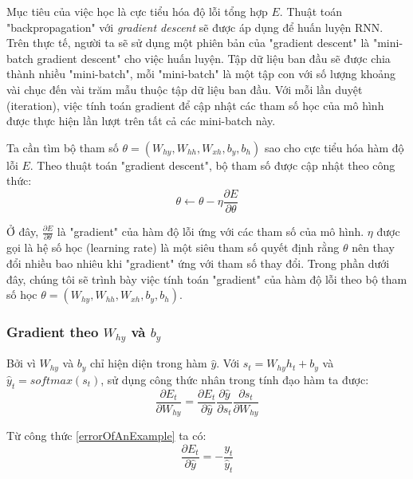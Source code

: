 Mục tiêu của việc học là cực tiểu hóa độ lỗi tổng hợp $E$. Thuật toán "backpropagation" với \textit{gradient descent} sẽ được áp dụng để huấn luyện RNN. Trên thực tế, người ta sẽ sử dụng một phiên bản của "gradient descent" là "mini-batch gradient descent" cho việc huấn luyện. Tập dữ liệu ban đầu sẽ được chia thành nhiều "mini-batch", mỗi "mini-batch" là một tập con với số lượng khoảng vài chục đến vài trăm mẫu thuộc tập dữ liệu ban đầu. Với mỗi lần duyệt (iteration), việc tính toán gradient để cập nhật các tham số học của mô hình được thực hiện lần lượt trên tất cả các mini-batch này.

Ta cần tìm bộ tham số $\theta = \left(W_{hy},W_{hh},W_{xh},b_y,b_h \right)$ sao cho cực tiểu hóa hàm độ lỗi $E$. Theo thuật toán "gradient descent", bộ tham số được cập nhật theo công thức:
\begin{equation} \label{gradientDescentWithTheta}
	\theta \leftarrow \theta - \eta \frac{\partial{E} }{\partial{\theta}}
\end{equation}

Ở đây, $\frac{\partial{E} }{\partial{\theta}}$ là "gradient" của hàm độ lỗi ứng với các tham số của mô hình. $\eta$ được gọi là hệ số học (learning rate) là một siêu tham số quyết định rằng $\theta$ nên thay đổi nhiều bao nhiêu khi "gradient" ứng với tham số thay đổi. Trong phần dưới đây, chúng tôi sẽ trình bày việc tính toán "gradient" của hàm độ lỗi theo bộ tham số học $\theta = \left(W_{hy},W_{hh},W_{xh},b_y,b_h \right)$.

\subsubsection{Gradient theo $W_{hy}$ và $b_y$}
Bởi vì $W_{hy}$ và $b_y$ chỉ hiện diện trong hàm $\hat{y}$. Với $s_t = W_{hy} h_t + b_y$ và $\hat{y}_t = softmax(s_t)$, sử dụng công thức nhân trong tính đạo hàm ta được:
\begin{equation} \label{gradientWRTSt1}
	\frac{\partial{E_t}}{\partial{W_{hy}}} = \frac{\partial{E_t}}{\partial{\hat{y}}} \frac{\partial{\hat{y}}}{\partial{s_t}} \frac{\partial{s_t}}{\partial{W_{hy}}}
\end{equation}

Từ công thức \ref{errorOfAnExample} ta có:
\begin{equation} \label{gradientWRTSt2}
	\frac{\partial{E_t}}{\partial{\hat{y}}} = -\frac{y_t}{\hat{y}_t}
\end{equation}


